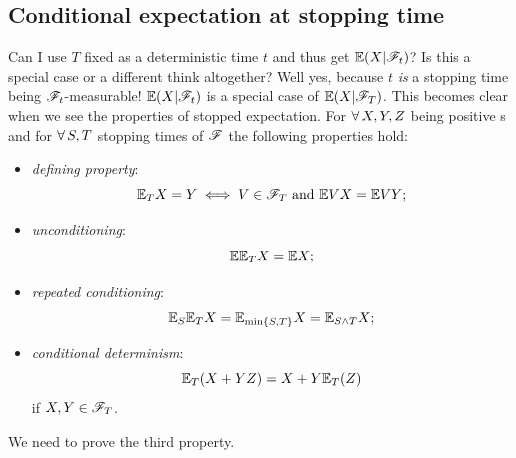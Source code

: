 \documentclass{report}
\begin{document}
\subsection{Conditional expectation at stopping time}
	Can I use $T$ fixed as a deterministic time $t$ and thus get $\mathbb{E}(X|\mathscr{F}_t)$? Is this a special case or a different think altogether? Well yes, because $t$ \textit{is} a stopping time being $\mathscr{F}_t$-measurable! $\mathbb{E}(X|\mathscr{F}_t)$ is a special case of $\mathbb{E}(X|\mathscr{F}_T)$.
	This becomes clear when we see the properties of stopped expectation. For $\forall\, X,Y,Z$ being positive \rv s and for $\forall\, S,T$ stopping times of $\mathscr{F}$ the following properties hold:
	\begin{itemize}
		\item \emph{defining property}:
		\[\mathbb{E}_T X=Y\iff V\in\mathscr{F}_T\text{ and }\mathbb{E} VX=\mathbb{E} VY;\]
		\item \emph{unconditioning}:
		\[\mathbb{E}\mathbb{E}_T X=\mathbb{E} X;\]
		\item \emph{repeated conditioning}:
		\[\mathbb{E}_S\mathbb{E}_T X=\mathbb{E}_{\min\{S,T\}}X=\mathbb{E}_{S\wedge T}X;\]
		\item \emph{conditional determinism}:
		\[\mathbb{E}_T(X+YZ)=X+Y\mathbb{E}_T(Z)\]
		if $X,Y\in\mathscr{F}_T$.
	\end{itemize}
	We need to prove the third property.
\end{document}
